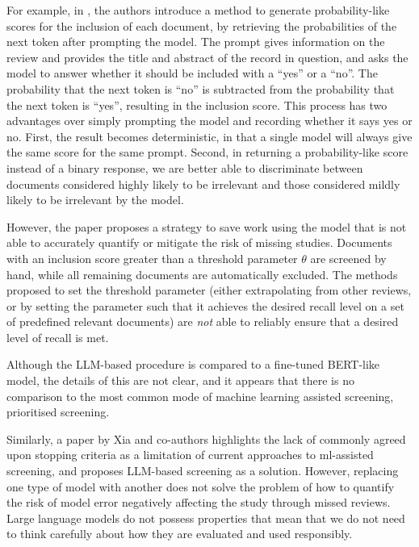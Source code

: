 \documentclass{article}
\begin{document}
	For example, in \cite{wang_zero-shot_2024}, the authors introduce a method to generate probability-like scores for the inclusion of each document, by retrieving the probabilities of the next token after prompting the model. The prompt gives information on the review and provides the title and abstract of the record in question, and asks the model to answer whether it should be included with a ``yes'' or a ``no''. The probability that the next token is ``no'' is subtracted from the probability that the next token is ``yes'', resulting in the inclusion score. This process has two advantages over simply prompting the model and recording whether it says yes or no. First, the result becomes deterministic, in that a single model will always give the same score for the same prompt. Second, in returning a probability-like score instead of a binary response, we are better able to discriminate between documents considered highly likely to be irrelevant and those considered mildly likely to be irrelevant by the model.
	
	However, the paper proposes a strategy to save work using the model that is not able to accurately quantify or mitigate the risk of missing studies. Documents with an inclusion score greater than a threshold parameter $\theta$ are screened by hand, while all remaining documents are automatically excluded. The methods proposed to set the threshold parameter (either extrapolating from other reviews, or by setting the parameter such that it achieves the desired recall level on a set of predefined relevant documents) are \textit{not} able to reliably ensure that a desired level of recall is met. 
	
	Although the LLM-based procedure is compared to a fine-tuned BERT-like model, the details of this are not clear, and it appears that there is no comparison to the most common mode of machine learning assisted screening, prioritised screening. 

    Similarly, a paper by Xia and co-authors \cite{xia_llmscreen_2024} highlights the lack of commonly agreed upon stopping criteria as a limitation of current approaches to ml-assisted screening, and proposes LLM-based screening as a solution. However, replacing one type of model with another does not solve the problem of how to quantify the risk of model error negatively affecting the study through missed reviews. Large language models do not possess properties that mean that we do not need to think carefully about how they are evaluated and used responsibly.
	
\end{document}
